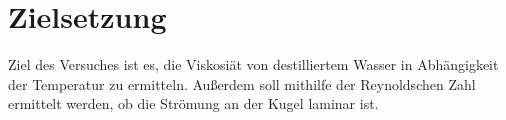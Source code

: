 \section{Zielsetzung}
\label{sec:Zielsetzung}

Ziel des Versuches ist es, die Viskosiät von destilliertem Wasser in Abhängigkeit der Temperatur zu ermitteln.
Außerdem soll mithilfe der Reynoldschen Zahl ermittelt werden, ob die Strömung an der Kugel laminar ist.
